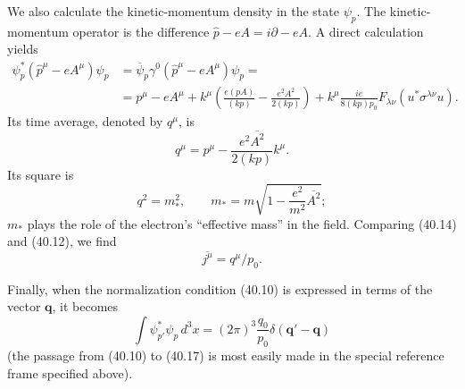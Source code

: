 We also calculate the kinetic-momentum density in the state $\psi_p$. The kinetic-momentum operator is the difference $\widehat p-eA=i\partial-eA$. A direct calculation yields
\begin{equation}
\begin{aligned}
\psi_p^*(\widehat p^\mu-eA^\mu)\psi_p
&=\overline{\psi}_p\gamma^0(\widehat p^\mu-eA^\mu)\psi_p={}\\
&=p^\mu-eA^\mu+k^\mu\left(\frac{e(pA)}{(kp)}-\frac{e^2A^2}{2(kp)}\right)
+k^\mu\frac{ie}{8(kp)p_0}F_{\lambda\nu}(u^*\sigma^{\lambda\nu}u).
\end{aligned}
\tag{40.13}
\end{equation}
Its time average, denoted by $q^\mu$, is
\begin{equation}
q^\mu=p^\mu-\frac{e^2\overline{A^2}}{2(kp)}k^\mu.
\tag{40.14}
\end{equation}
Its square is
\begin{equation}
q^2=m_*^2,
\qquad
m_*=m\sqrt{1-\frac{e^2}{m^2}\overline{A^2}};
\tag{40.15}
\end{equation}
$m_*$ plays the role of the electron's ``effective mass'' in the field. Comparing (40.14) and (40.12), we find
\begin{equation}
\overline{j^\mu}=q^\mu/p_0.
\tag{40.16}
\end{equation}

Finally, when the normalization condition (40.10) is expressed in terms of the vector $\mathbf q$, it becomes
\begin{equation}
\int\psi_{p'}^*\psi_p\,d^3x
=(2\pi)^3\frac{q_0}{p_0}\delta(\mathbf q'-\mathbf q)
\tag{40.17}
\end{equation}
(the passage from (40.10) to (40.17) is most easily made in the special reference frame specified above).
